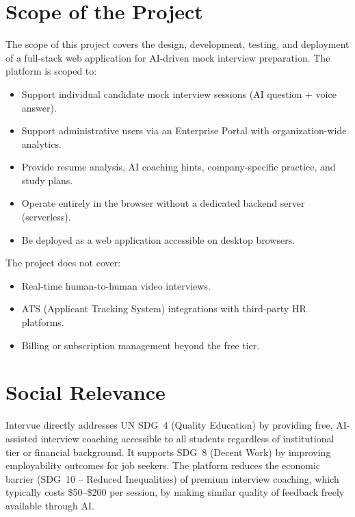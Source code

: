 \documentclass{fisatprojectfinal}
\begin{document}
\section{Scope of the Project}
The scope of this project covers the design, development, testing, and deployment of a
full-stack web application for AI-driven mock interview preparation. The platform is scoped to:
\begin{itemize}
  \item Support individual candidate mock interview sessions (AI question + voice answer).
  \item Support administrative users via an Enterprise Portal with organization-wide analytics.
  \item Provide resume analysis, AI coaching hints, company-specific practice, and study plans.
  \item Operate entirely in the browser without a dedicated backend server (serverless).
  \item Be deployed as a web application accessible on desktop browsers.
\end{itemize}
The project does not cover:
\begin{itemize}
  \item Real-time human-to-human video interviews.
  \item ATS (Applicant Tracking System) integrations with third-party HR platforms.
  \item Billing or subscription management beyond the free tier.
\end{itemize}

\section{Social Relevance}
Intervue directly addresses UN SDG~4 (Quality Education) by providing free, AI-assisted
interview coaching accessible to all students regardless of institutional tier or financial
background. It supports SDG~8 (Decent Work) by improving employability outcomes for job
seekers. The platform reduces the economic barrier (SDG~10 -- Reduced Inequalities) of
premium interview coaching, which typically costs \$50--\$200 per session, by making
similar quality of feedback freely available through AI.
\end{document}

